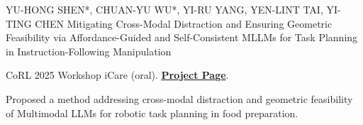 

\begin{cventries}


  \cventrypub
  {YU-HONG SHEN*, CHUAN-YU WU*, YI-RU YANG, YEN-LINT TAI, YI-TING CHEN} %
  {Mitigating Cross-Modal Distraction and Ensuring Geometric Feasibility via Affordance-Guided and Self-Consistent MLLMs for Task Planning in Instruction-Following Manipulation} %
  {} %
  {} %
  {
    \begin{cvitems} %
      \item {CoRL 2025 Workshop iCare (oral). \href{https://hcis-lab.github.io/Affordance-Guided-Self-Consistent-MLLM/}{\textbf{Project Page}}.}
      \item {Proposed a method addressing cross-modal distraction and geometric feasibility of Multimodal LLMs for robotic task planning in food preparation.}
    \end{cvitems}
  }
  

\end{cventries}
